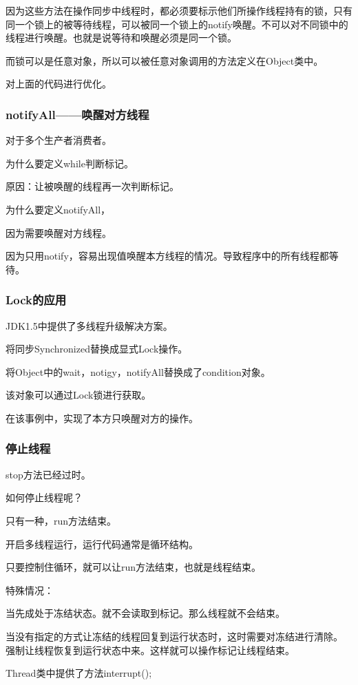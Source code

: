 \documentclass[UTF8]{ctexart}
\begin{document}
因为这些方法在操作同步中线程时，都必须要标示他们所操作线程持有的锁，只有同一个锁上的被等待线程，可以被同一个锁上的notify唤醒。不可以对不同锁中的线程进行唤醒。也就是说等待和唤醒必须是同一个锁。

而锁可以是任意对象，所以可以被任意对象调用的方法定义在Object类中。



对上面的代码进行优化。



\subsubsection{notifyAll——唤醒对方线程}

对于多个生产者消费者。

为什么要定义while判断标记。

原因：让被唤醒的线程再一次判断标记。

为什么要定义notifyAll，

因为需要唤醒对方线程。

因为只用notify，容易出现值唤醒本方线程的情况。导致程序中的所有线程都等待。



\subsubsection{Lock的应用}

JDK1.5中提供了多线程升级解决方案。

将同步Synchronized替换成显式Lock操作。

将Object中的wait，notigy，notifyAll替换成了condition对象。

该对象可以通过Lock锁进行获取。

在该事例中，实现了本方只唤醒对方的操作。



\subsubsection{停止线程}

stop方法已经过时。

如何停止线程呢？

只有一种，run方法结束。

开启多线程运行，运行代码通常是循环结构。

只要控制住循环，就可以让run方法结束，也就是线程结束。

特殊情况：

当先成处于冻结状态。就不会读取到标记。那么线程就不会结束。

当没有指定的方式让冻结的线程回复到运行状态时，这时需要对冻结进行清除。
强制让线程恢复到运行状态中来。这样就可以操作标记让线程结束。

Thread类中提供了方法interrupt();


\end{document}
